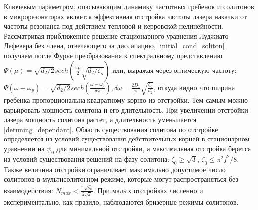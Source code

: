 Ключевым параметром, описывающим динамику частотных гребенок и солитонов в микрорезонаторах является эффективная отстройка частоты лазера накачки от частоты резонанса под действием тепловой и керровской нелинейности. Рассматривая приближенное решение стационарного уравнения Луджиато-Лефевера без члена, отвечающего за диссипацию, \ref{initial_cond_soliton} получаем после Фурье преобразования к спектральному представлению $\Psi(\mu)=\sqrt{d_2/2} sech(\frac{\pi\mu}{2}\sqrt{d_2/\zeta_o})$ или, выражая через оптическую частоту: $\Psi(\omega-\omega_p)=\sqrt{d_2/2} sech(\frac{\omega-\omega_p}{\delta\omega}), \delta\omega=\frac{2D_1}{\pi}\sqrt{\frac{\zeta_0}{d_2}}$, откуда видно что ширина гребенка пропорциональна квадратному корню из отстройки. Тем самым можно варьировать мощность солитона и его длительность. При увеличении отстройки лазера мощность солитона растет, а длительность уменьшается \ref{detuning_dependant}. Область существования солитона по отстройке определяется из условий существования действительных корней в стационарном уравнении на $\psi_0$ для минимальной отстройки, а максимальная отстройка берется из условий существования решений на фазу солитона: $\zeta_0\geq\sqrt{3}$, $\zeta_0\leq \pi^2 f^2/8$. Также величина отстройки ограничивает максимально допустимое число солитонов в мультисолитонном режиме, которые могут распространяться без взаимодействия: $N_{max}<\frac{\pi\sqrt{\zeta_0}}{2\sqrt{2}}$. При малых отстройках численно и экспериментально, как правило, наблюдаются бризерные режимы солитонов.

